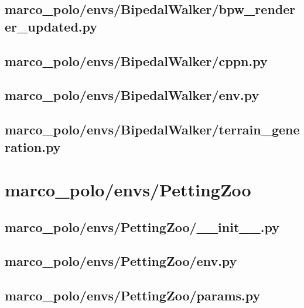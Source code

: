 \documentclass{article}
\begin{document}
\subsection[bpw\_renderer\_updated.py]{marco\_polo/envs/BipedalWalker/bpw\_renderer\_updated.py}

\newpage

\subsection[cppn.py]{marco\_polo/envs/BipedalWalker/cppn.py}

\newpage

\subsection[env.py]{marco\_polo/envs/BipedalWalker/env.py}

\newpage

\subsection[terrain\_generation.py]{marco\_polo/envs/BipedalWalker/terrain\_generation.py}

\newpage

\section{marco\_polo/envs/PettingZoo}
\subsection[\_\_init\_\_.py]{marco\_polo/envs/PettingZoo/\_\_init\_\_.py}

\newpage

\subsection[env.py]{marco\_polo/envs/PettingZoo/env.py}

\newpage

\subsection[params.py]{marco\_polo/envs/PettingZoo/params.py}

\newpage
\end{document}
